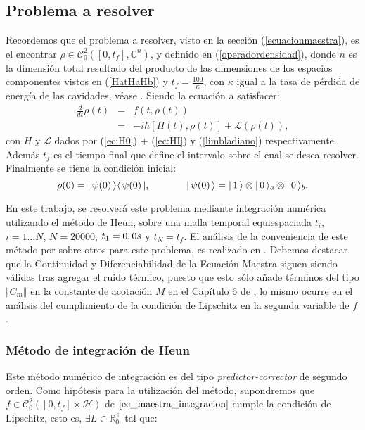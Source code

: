 \subsection{Problema a resolver}\label{sec:problema_resolver}
\quad Recordemos que el problema a resolver, visto en la secci\'on (\ref{ecuacionmaestra}), es el encontrar $\rho\in \mathcal{C}^2_0\left([0,t_f],\mathbb{C}^n\right)$, y definido en (\ref{operadordensidad}), donde $n$ es la dimensi\'on total resultado del producto de las dimensiones de los espacios componentes vistos en (\ref{HatHaHb}) y $t_f=\frac{100}{\kappa}$, con $\kappa$ igual a la tasa de p\'erdida de energ\'ia de las cavidades, v\'ease \cite{single-photon-walther}. Siendo la ecuaci\'on a satisfacer:
\begin{eqnarray}
 \frac{d}{dt}\rho(t)&=&f\left(t,\rho(t)\right)\\
&=&-i\hbar\left[H(t),\rho(t)\right]+\mathcal{L}(\rho(t)),\label{ec_maestra_integracion}
\end{eqnarray}
con $H$ y $\mathcal{L}$ dados por (\ref{ec:H0}) + (\ref{ec:HI}) y (\ref{limbladiano}) respectivamente. Adem\'as $t_f$ es el tiempo final que define el intervalo sobre el cual se desea resolver. Finalmente se tiene la condici\'on inicial:
\begin{equation}
 \rho(0)=\vert\, \psi(0) \,\rangle\langle\, \psi(0) \,\vert,\hspace*{1.3cm}\vert\, \psi(0) \,\rangle=\vert\, 1 \,\rangle\otimes\vert\, 0 \,\rangle_a\otimes \vert\, 0 \,\rangle_b.
\end{equation}

\quad En este trabajo, se resolver\'a este problema mediante integraci\'on num\'erica utilizando el m\'etodo de Heun, sobre una malla temporal equiespaciada $t_i,$ $i=1\ldots N$, $N=20000$, $t_1=0\ldotp0s$ y $t_N=t_f$. El an\'alisis de la conveniencia de este m\'etodo por sobre otros para este problema, es realizado en \cite{gino}. Debemos destacar que la Continuidad y Diferenciabilidad de la Ecuaci\'on Maestra siguen siendo v\'alidas tras agregar el ruido t\'ermico, puesto que esto s\'olo a\~nade t\'erminos del tipo $\Vert C_m\Vert$ en la constante de acotaci\'on $M$ en el Cap\'itulo 6 de \cite{gino}, lo mismo ocurre en el an\'alisis del cumplimiento de la condici\'on de Lipschitz en la segunda variable de $f$.

\subsubsection{M\'etodo de integraci\'on de Heun}
\quad Este m\'etodo num\'erico de integraci\'on es del tipo \emph{predictor-corrector} de segundo orden. Como hip\'otesis para la utilizaci\'on del m\'etodo, supondremos que $f\in \mathcal{C}_0^2([0,t_f]\times\mathcal{H})$ de $\ref{ec_maestra_integracion}$ cumple la condici\'on de Lipschitz, esto es, $\exists L\in \mathbb{R}^+_0$ tal que:


